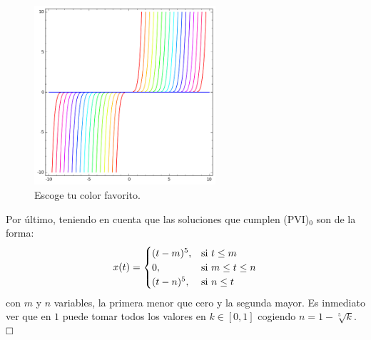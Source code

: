 \documentclass[spanish, a4paper, 12pt] {article}
\begin{document}
\begin{itemize}
{{\begin{figure}[!ht]
\centering
\includegraphics[width=0.6\textwidth]{plot.png}
\caption{Escoge tu color favorito.}
\end{figure}}

Por último, teniendo en cuenta que las soluciones que cumplen (PVI)$_0$ son de la forma:
$$
\begin{displaystyle}
  x(t) =
  \begin{cases}
    (t - m)^{5}, & \text{si } t \leq m \\
    0, & \text{si } m \le t \leq n \\
    (t - n)^{5}, & \text{si } n \le t
  \end{cases}
\end{displaystyle}
$$
con $m$ y $n$ variables, la primera menor que cero y la segunda mayor. Es inmediato ver que en $1$ puede tomar todos los valores en $k\in[0, 1]$ cogiendo $n = 1  - \sqrt[5]{k}$.
$\hfill \square$
}
\end{itemize}
\end{document}
